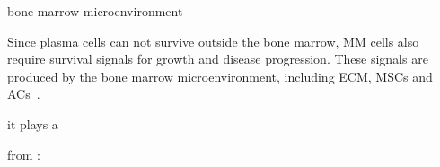 \label{sec:intro_myeloma_hMSC}

bone marrow microenvironment

Since plasma cells can not survive outside the bone marrow, MM cells also
require survival signals for growth and disease progression. These signals are
produced by the bone marrow microenvironment, including ECM, MSCs and
ACs~\cite{kiblerAdhesiveInteractionsHuman1998,
    garcia-ortizRoleTumorMicroenvironment2021}.

it plays a

from \cite{forsterMolecularImpactTumor2022}:

